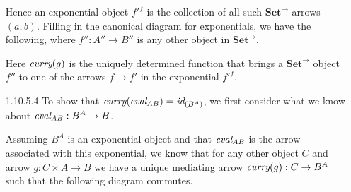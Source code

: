 \documentclass{article}
\newcommand{\curry}[1]{\emph{curry}(#1)}
\newcommand{\eval}{\emph{eval}}
\newcommand{\id}{\emph{id}}
\newcommand{\cseta}{\mathbf{Set}^{\rightarrow}}
\begin{document}
\begin{enumerate}
\begin{center}
  \end{center}

  Hence an exponential object $f'^f$ is the collection of all such $\cseta$ arrows $(a,b)$.
  Filling in the canonical diagram for exponentials, we have the following, where $f'' : A'' \rightarrow B''$ is any other object in $\cseta$.
  \begin{center}
  \end{center}
  Here $\curry{g}$ is the uniquely determined function that brings a $\cseta$ object $f''$ to one of the arrows $f \rightarrow f'$ in the exponential $f'^f$.

\newpage
\item [1.10.5.4]
  To show that $\curry{\eval_{AB}} = \id_{(B^A)}$, we first consider what we know about $\eval_{AB} : B^A \rightarrow B$.
  \begin{center}
  \end{center}
  
  Assuming $B^A$ is an exponential object and that $\eval_{AB}$ is the arrow associated with this exponential, we know that for any other object $C$ and arrow $g : C \times A \rightarrow B$ we have a unique mediating arrow $\curry{g} : C \rightarrow B^A$ such that the following diagram commutes.
  \begin{center}
\end{center}
\end{enumerate}
\end{document}
